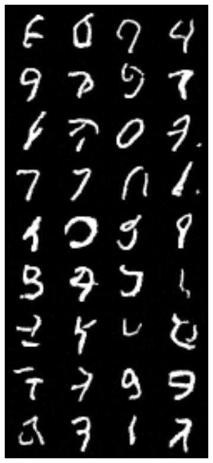 \begin{figure}
\centering
\begin{subfigure}{0.3\textwidth}
    \centering
    \includegraphics[width=1\textwidth]{figures/q1b_samples_def_final}

\end{subfigure}
\end{figure}
